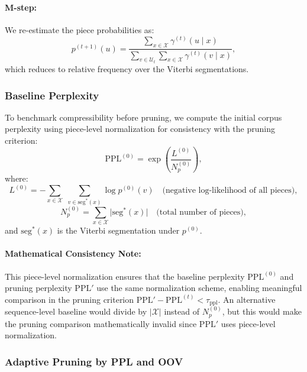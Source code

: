 \paragraph{M-step:}

We re-estimate the piece probabilities as:
\begin{equation}
p^{(t+1)}(u)
= \frac{
	\sum_{x \in \mathcal X} \gamma^{(t)}(u \mid x)
}{
	\sum_{v \in \mathcal U_t} \sum_{x \in \mathcal X} \gamma^{(t)}(v \mid x)
},
\label{eq:m_step_update}
\end{equation}
which reduces to relative frequency over the Viterbi segmentations.

\subsubsection{Baseline Perplexity}

To benchmark compressibility before pruning, we compute the initial corpus perplexity using piece-level normalization for consistency with the pruning criterion:
\begin{equation}
\mathrm{PPL}^{(0)}
= \exp\left(
\frac{L^{(0)}}{N_{p}^{(0)}}
\right),
\label{eq:baseline_perplexity}
\end{equation}
where:
\[
L^{(0)} = -\sum_{x\in\mathcal X}\;\sum_{v\in\mathrm{seg}^{*}(x)}\log p^{(0)}(v)
\quad\text{(negative log-likelihood of all pieces)},
\]
\[
N_{p}^{(0)} = \sum_{x\in\mathcal X} \bigl|\mathrm{seg}^{*}(x)\bigr|
\quad\text{(total number of pieces)},
\]
and \(\mathrm{seg}^{*}(x)\) is the Viterbi segmentation under \(p^{(0)}\).

\paragraph{Mathematical Consistency Note:} 
This piece-level normalization ensures that the baseline perplexity \(\mathrm{PPL}^{(0)}\) and pruning perplexity \(\mathrm{PPL}'\) use the same normalization scheme, enabling meaningful comparison in the pruning criterion \(\mathrm{PPL}' - \mathrm{PPL}^{(t)} < \tau_{\mathrm{ppl}}\). An alternative sequence-level baseline would divide by \(|\mathcal X|\) instead of \(N_{p}^{(0)}\), but this would make the pruning comparison mathematically invalid since \(\mathrm{PPL}'\) uses piece-level normalization.

\subsubsection{Adaptive Pruning by PPL and OOV}

